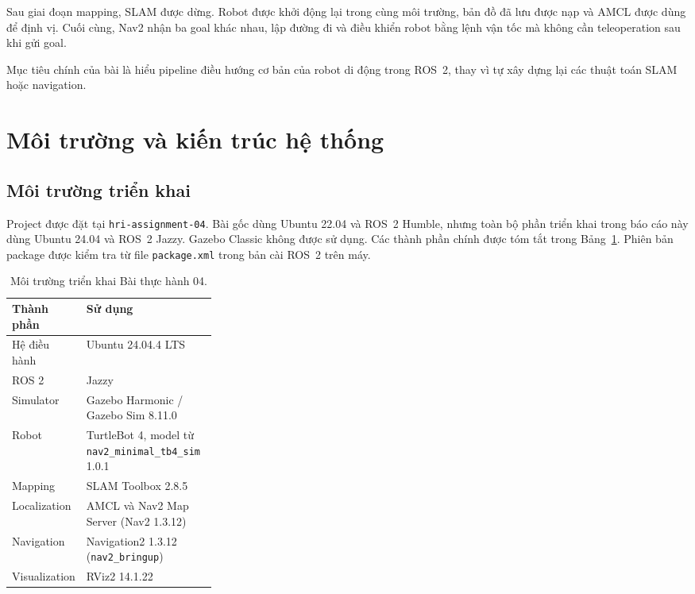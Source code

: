 \documentclass[12pt,a4paper]{article}
\newcommand{\projectpath}{\texttt{hri-assignment-04}}
\begin{document}
Sau giai đoạn mapping, SLAM được dừng. Robot được khởi động lại trong cùng môi
trường, bản đồ đã lưu được nạp và AMCL được dùng để định vị. Cuối cùng, Nav2
nhận ba goal khác nhau, lập đường đi và điều khiển robot bằng lệnh vận tốc mà
không cần teleoperation sau khi gửi goal.

Mục tiêu chính của bài là hiểu pipeline điều hướng cơ bản của robot di động
trong ROS~2, thay vì tự xây dựng lại các thuật toán SLAM hoặc navigation.

\section{Môi trường và kiến trúc hệ thống}

\subsection{Môi trường triển khai}

Project được đặt tại \projectpath{}. Bài gốc dùng Ubuntu 22.04 và ROS~2 Humble,
nhưng toàn bộ phần triển khai trong báo cáo này dùng Ubuntu 24.04 và ROS~2
Jazzy. Gazebo Classic không được sử dụng. Các thành phần chính được tóm tắt
trong Bảng~\ref{tab:environment}. Phiên bản package được kiểm tra từ file
\texttt{package.xml} trong bản cài ROS~2 trên máy.

\begin{table}[htbp]
  \centering
  \caption{Môi trường triển khai Bài thực hành 04.}
  \label{tab:environment}
  \renewcommand{\arraystretch}{1.18}
  \begin{tabularx}{\linewidth}{@{}p{0.30\linewidth}X@{}}
    \toprule
    \textbf{Thành phần} & \textbf{Sử dụng} \\
    \midrule
    Hệ điều hành & Ubuntu 24.04.4 LTS \\
    ROS 2 & Jazzy \\
    Simulator & Gazebo Harmonic / Gazebo Sim 8.11.0 \\
    Robot & TurtleBot 4, model từ \texttt{nav2\_minimal\_tb4\_sim} 1.0.1 \\
    Mapping & SLAM Toolbox 2.8.5 \\
    Localization & AMCL và Nav2 Map Server (Nav2 1.3.12) \\
    Navigation & Navigation2 1.3.12 (\texttt{nav2\_bringup}) \\
    Visualization & RViz2 14.1.22 \\
    \bottomrule
  \end{tabularx}
\end{table}
\end{document}
